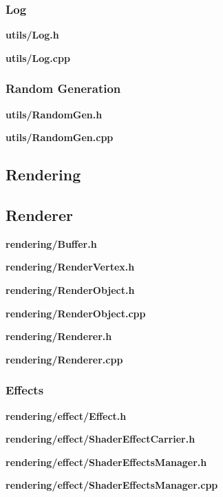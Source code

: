 \documentclass[../Main.tex]{subfiles}
\begin{document}
        \subsubsection{Log}
            \textbf{utils/Log.h}
            
            \textbf{utils/Log.cpp}
            

        \subsubsection{Random Generation}
            \textbf{utils/RandomGen.h}
            
            \textbf{utils/RandomGen.cpp}
            

    \subsection{Rendering}
        \subsection{Renderer}
            \textbf{rendering/Buffer.h}
            
            \textbf{rendering/RenderVertex.h}
            

            \textbf{rendering/RenderObject.h}
            
            \textbf{rendering/RenderObject.cpp}
            

            \textbf{rendering/Renderer.h}
            
            \textbf{rendering/Renderer.cpp}
            

        \subsubsection{Effects}
            \textbf{rendering/effect/Effect.h}
            
            \textbf{rendering/effect/ShaderEffectCarrier.h}
            
            \textbf{rendering/effect/ShaderEffectsManager.h}
            
            \textbf{rendering/effect/ShaderEffectsManager.cpp}
            
\end{document}
